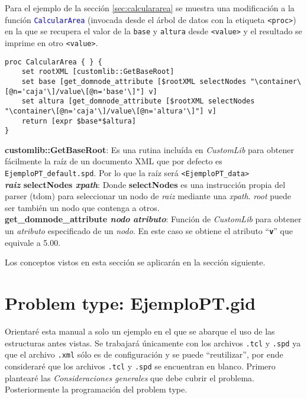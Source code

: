\documentclass[10pt, a4paper, twocolumn]{article} %
\begin{document}
Para el ejemplo de la sección \ref{sec:calculararea} se muestra una modificación a la función \textcolor{blue}{\texttt{CalcularArea}} (invocada desde el árbol de datos con la etiqueta \texttt{<proc>}) en la que se recupera el valor de la \texttt{base} y \texttt{altura} desde \texttt{<value>} y el resultado se imprime en otro \texttt{<value>}.

\lstset{language=tcl} 
\begin{lstlisting}[caption={Cálculo del área obteniendo los valores desde el archivo \texttt{.spd} usando las funciones de \texttt{CustomLib}.}]
proc CalcularArea { } {
	set rootXML [customlib::GetBaseRoot]
	set base [get_domnode_attribute [$rootXML selectNodes "\container\[@n='caja'\]/value\[@n='base'\]"] v]
	set altura [get_domnode_attribute [$rootXML selectNodes "\container\[@n='caja'\]/value\[@n='altura'\]"] v]
	return [expr $base*$altura]
}
\end{lstlisting} 

\textbf{customlib::GetBaseRoot}: Es una rutina incluída en \textit{CustomLib} para obtener fácilmente la raíz de un documento XML que por defecto es \texttt{EjemploPT\_default.spd}. Por lo que la raíz será \texttt{<EjemploPT\_data>}\\
\textbf{\textit{raiz} selectNodes \textit{xpath}}: Donde \textbf{selectNodes} es una instrucción propia del parser (tdom) para seleccionar un nodo de \textit{raiz} mediante una \textit{xpath}. \textit{root} puede ser también un nodo que contenga a otros.\\
\textbf{get\_domnode\_attribute \textit{nodo} \textit{atributo}}: Función  de \textit{CustomLib} para obtener un \textit{atributo} especificado de un \textit{nodo}. En este caso se obtiene el atributo ``\texttt{\textbf{v}}'' que equivale a 5.00.

Los conceptos vistos en esta sección se aplicarán en la sección siguiente.

\section{Problem type: EjemploPT.gid}

Orientaré esta manual a solo un ejemplo en el que se abarque el uso de las estructuras antes vistas. Se trabajará únicamente con los archivos \texttt{.tcl} y \texttt{.spd} ya que el archivo \texttt{.xml} sólo es de configuración y se puede ``reutilizar'', por ende consideraré que los archivos \texttt{.tcl} y \texttt{.spd} se encuentran en blanco. Primero plantearé las \textit{Consideraciones generales} que debe cubrir el problema. Posteriormente la programación del problem type. 
\end{document}
